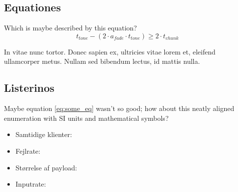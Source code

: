 \subsection{Equationes}
Which is maybe described by this equation?
\begin{equation}
\label{eq:some_eq}
t_{tone} -(2 \cdot a_{fade} \cdot t_{tone}) \geq 2 \cdot t_{chunk} 
\end{equation}

In vitae nunc tortor. Donec sapien ex, ultricies vitae lorem et, eleifend ullamcorper metus. Nullam sed bibendum lectus, id mattis nulla.

\subsection{Listerinos}
Maybe equation \ref{eq:some_eq} wasn't so good; how about this neatly aligned enumeration with SI units and mathematical symbols?\medskip

\begin{itemize}[noitemsep]
    \item Samtidige klienter:
    \item Fejlrate: 
    \item Størrelse af payload: 
    \item Inputrate:
\end{itemize}